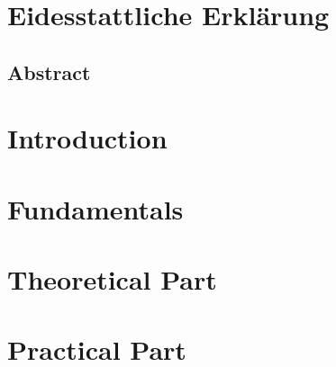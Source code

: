 \documentclass[
12pt,							%
oneside,							%
openany,							%
headsepline,						%
listof=flat,						%
numbers=noenddot					%
]{scrbook}
\begin{document}




%
\mainmatter						%
\begin{titlepage}

\end{titlepage}
\pagebreak
\chapter*{Eidesstattliche Erklärung}

\thispagestyle{empty} %
\pagebreak

\thispagestyle{empty} 
\section*{Abstract}
\thispagestyle{empty} 

\vspace{-0.5cm}\tableofcontents			%
\listoftables				%
\listoffigures				%
\pagebreak

%
%
\chapter{Introduction}
\label{chap:Intro}
    
\chapter{Fundamentals}
\label{chap:fundamentals}
    
\chapter{Theoretical Part}
\label{chap:theory}
    

\chapter{Practical Part}
\label{chap:practical}
    
\end{document}
